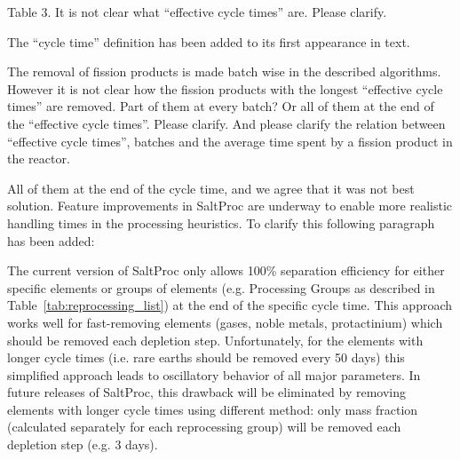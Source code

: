 \documentclass[answers,11pt]{exam}
\begin{document}
\begin{questions}
\begin{solution}
                
        \end{solution}


        \question Table 3. It is not clear what ``effective cycle times'' are. 
        Please clarify.
        \begin{solution}
                The ``cycle time'' definition has been added to its first appearance in text.
        \end{solution}


        \question The removal of fission products is made batch wise in the 
        described algorithms. However it is not clear how the fission products 
        with the longest ``effective cycle times'' are removed. Part of them at 
        every batch? Or all of them at the end of the  ``effective cycle 
        times''.  Please clarify. And please clarify the relation between 
        ``effective cycle times'', batches and the average time spent by a 
        fission product in the reactor.
        \begin{solution}
                All of them at the end of the cycle time, and we agree that it
                 was not best solution. Feature improvements in SaltProc are 
                 underway to enable more realistic handling times in the 
                 processing heuristics. To clarify this following paragraph has 
                been added:
                
                The current version of SaltProc only allows 100\% separation 
                efficiency for either specific elements or groups of elements 
                (e.g. Processing Groups as described in 
                Table~\ref{tab:reprocessing_list}) at the end of the specific 
                cycle time.  This approach works well for fast-removing 
                elements (gases, noble metals, protactinium) which should be 
                removed each depletion step. Unfortunately, for the elements 
                with longer cycle times (i.e. rare earths should be removed 
                every 50 days) this simplified approach leads to oscillatory 
                behavior of all major parameters. In future releases of 
                SaltProc, this drawback will be eliminated by removing elements 
                with longer cycle times using different method: only mass 
                fraction (calculated separately for each reprocessing group) 
                will be removed each depletion step (e.g. 3 days).


\end{solution}
\end{questions}
\end{document}

